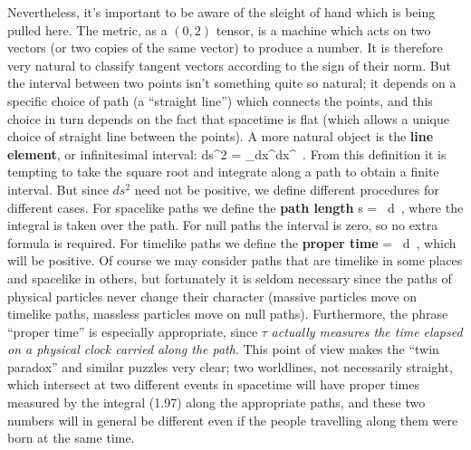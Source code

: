 Nevertheless, it's important to be aware of the sleight of hand which is 
being pulled here.  The metric, as a $(0,2)$ tensor, is a machine which 
acts on two vectors (or two copies of the same vector) to produce a number.
It is therefore very natural to classify tangent vectors according to
the sign of their norm.  But the interval between two points isn't
something quite so natural; it depends on a specific choice of path
(a ``straight line'') which connects the points, and this choice in
turn depends on the fact that spacetime is flat (which allows a 
unique choice of straight line between the points).  A more natural
object is the {\bf line element}, or infinitesimal interval:
\be
  ds^2 = \eta_\mn dx^\mu dx^\nu\ .\label{1.95}
\ee
From this definition it is tempting to take the square root and
integrate along a path to obtain a finite interval.  But since $ds^2$
need not be positive, we define different procedures for different
cases.  For spacelike paths we define the {\bf path length}
\be
  \Delta s = \int {}\ d\lambda\ ,\label{1.96}
\ee
where the integral is taken over the path.  For null paths the interval
is zero, so no extra formula is required.  For timelike paths we define
the {\bf proper time}
\be
  \Delta \tau = \int {}\ d\lambda\ ,\label{1.97}
\ee
which will be positive.  Of course we may consider paths that are
timelike in some places and spacelike in others, but fortunately
it is seldom necessary since the paths of physical particles never
change their character (massive particles move on timelike paths,
massless particles move on null paths).  Furthermore, the phrase
``proper time'' is especially appropriate, since $\tau$ {\it actually
measures the time elapsed on a physical clock carried along the path}.
This point of view makes the ``twin paradox'' and similar puzzles
very clear; two worldlines, not necessarily straight, which intersect at 
two different events in spacetime will have proper times measured by the
integral (1.97) along the appropriate paths, and these two numbers will
in general be different even if the people travelling along them were
born at the same time.

